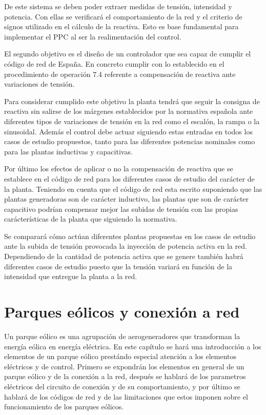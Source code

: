 \documentclass{book}
\begin{document}
De este sistema se deben poder extraer medidas de tensi\'on, intensidad y potencia. Con ellas se verificar\'a el comportamiento de la red y el criterio de signos utilizado en el c\'alculo de la reactiva. Esto es base fundamental para implementar el PPC al ser la realimentaci\'on del control. \par

El segundo objetivo es el diseño de un controlador que sea capaz de cumplir el c\'odigo de red de España. En concreto cumplir con lo establecido en el procedimiento de operaci\'on 7.4 referente a compensaci\'on de reactiva ante variaciones de tensi\'on. \par

Para considerar cumplido este objetivo la planta tendr\'a que seguir la consigna de reactiva sin salirse de los m\'argenes establecidos por la normativa española ante diferentes tipos de variaciones de tensi\'on en la red como el escal\'on, la rampa o la sinusoidal. Adem\'as el control debe actuar siguiendo estas entradas en todos los casos de estudio propuestos, tanto para las diferentes potencias nominales como para las plantas inductivas y capacitivas. \par

Por \'ultimo los efectos de aplicar o no la compensaci\'on de reactiva que se establece en el c\'odigo de red para los diferentes casos de estudio del car\'acter de la planta. Teniendo en cuenta que el c\'odigo de red esta escrito suponiendo que las plantas generadoras son de car\'acter inductivo, las plantas que son de car\'acter capacitivo podr\'ian compensar mejor las subidas de tensi\'on con las propias car\'acter\'isticas de la planta que siguiendo la normativa. \par

Se comparar\'a c\'omo act\'uan diferentes plantas propuestas en los casos de estudio ante la subida de tensi\'on provocada la inyecci\'on de potencia activa en la red. Dependiendo de la cantidad de potencia activa que se genere tambi\'en habr\'a diferentes casos de estudio puesto que la tensi\'on variar\'a en funci\'on de la intensidad que entregue la planta a la red. \par


\chapter{Parques e\'olicos y conexi\'on a red}

Un parque e\'olico es una agrupaci\'on de aerogeneradores que transforman la energ\'ia e\'olica en energ\'ia el\'ectrica. En este cap\'itulo se har\'a una introducci\'on a los elementos de un parque e\'olico prest\'ando especial atenci\'on a los elementos el\'ectricos y de control. Primero se expondr\'an los elementos en general de un parque e\'olico y de la conexi\'on a la red, despu\'es se hablar\'a de los parametros el\'ectricos del circuito de conexi\'on y de su comportamiento, y por \'ultimo se hablar\'a de los c\'odigos de red y de las limitaciones que estos imponen sobre el funcionamiento de los parques e\'olicos.  
\end{document}
